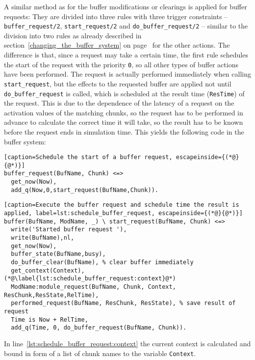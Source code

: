 A similar method as for the buffer modifications or clearings is applied for buffer requests: They are divided into three rules with three trigger constraints -- \lstinline|buffer_request/2|, \lstinline|start_request/2| and \lstinline|do_buffer_request/2| -- similar to the division into two rules as already described in section~\ref{changing_the_buffer_system} on page~\pageref{changing_the_buffer_system} for the other actions. The difference is that, since a request may take a certain time, the first rule schedules the start of the request with the priority \lstinline|0|, so all other types of buffer actions have been performed. The request is actually performed immediately when calling \lstinline|start_request|, but the effects to the requested buffer are applied not until \lstinline|do_buffer_request| is called, which is scheduled at the result time (\lstinline|ResTime|) of the request. This is due to the dependence of the latency of a request on the activation values of the matching chunks, so the request has to be performed in advance to calculate the correct time it will take, so the result has to be known before the request ends in simulation time. This yields the following code in the buffer system:

\begin{lstlisting}[caption=Schedule the start of a buffer request, escapeinside={(*@}{@*)}]
buffer_request(BufName, Chunk) <=>
  get_now(Now),
  add_q(Now,0,start_request(BufName,Chunk)).
\end{lstlisting}

\begin{lstlisting}[caption=Execute the buffer request and schedule time the result is applied, label=lst:schedule_buffer_request, escapeinside={(*@}{@*)}]
buffer(BufName, ModName, _) \ start_request(BufName, Chunk) <=> 
  write('Started buffer request '),
  write(BufName),nl,
  get_now(Now),
  buffer_state(BufName,busy),
  do_buffer_clear(BufName), % clear buffer immediately
  get_context(Context), (*@\label{lst:schedule_buffer_request:context}@*)
  ModName:module_request(BufName, Chunk, Context, ResChunk,ResState,RelTime),
  performed_request(BufName, ResChunk, ResState), % save result of request
  Time is Now + RelTime, 
  add_q(Time, 0, do_buffer_request(BufName, Chunk)).
\end{lstlisting}

In line~\ref{lst:schedule_buffer_request:context} the current context is calculated and bound in form of a list of chunk names to the variable \lstinline|Context|.
  
